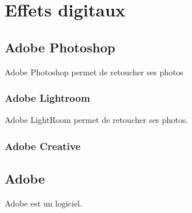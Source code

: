 \documentclass{article}
\begin{document}
\section{Effets digitaux}
\subsection{Adobe Photoshop}
Adobe Photoshop permet de retoucher ses photos

\subsubsection{Adobe Lightroom}
Adobe LightRoom permet de retoucher ses photos.
\subsubsection{Adobe Creative}

\subsection{Adobe}
Adobe est un logiciel.
\end{document}
